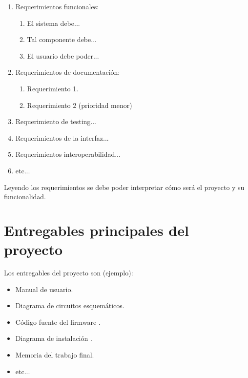 \documentclass[12pt]{catolica_proyectos}
\begin{document}
	\begin{enumerate}
		\item Requerimientos funcionales:
		\begin{enumerate}
			\item El sistema debe...
			\item Tal componente debe...
			\item El usuario debe poder...
		\end{enumerate}
		\item Requerimientos de documentación:
		\begin{enumerate}
			\item Requerimiento 1.
			\item Requerimiento 2 (prioridad menor)
		\end{enumerate}
		\item Requerimiento de testing...
		\item Requerimientos de la interfaz...
		\item Requerimientos interoperabilidad...
		\item etc...
	\end{enumerate}
	
	Leyendo los requerimientos se debe poder interpretar cómo será el proyecto y su funcionalidad.
	
	
	\section{Entregables principales del proyecto}
	
	Los entregables del proyecto son (ejemplo):
	
	\begin{itemize}
		\item Manual de usuario.
		\item Diagrama de circuitos esquemáticos.
		\item Código fuente del firmware \cite{ucb2026}.
		\item Diagrama de instalación \cite{doe2024}.
		\item Memoria del trabajo final.\cite{ogata2010}
		\item etc...
	\end{itemize}
	
	\newpage
	\printbibliography[heading=bibintoc, title={Referencias Bibliográficas}]
		
\end{document}
